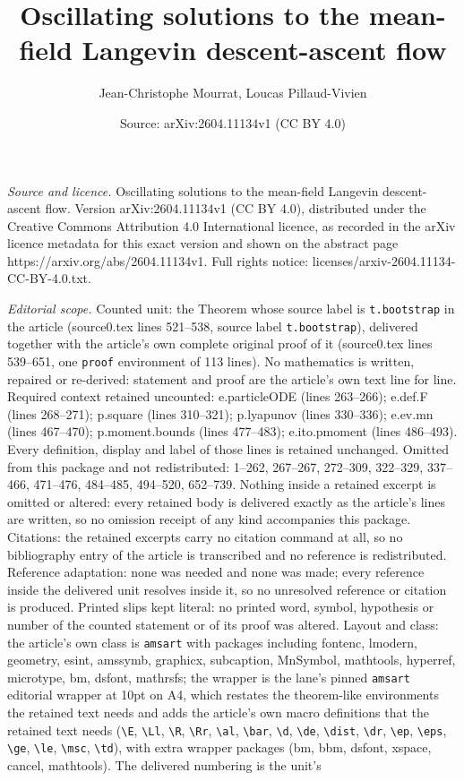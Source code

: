 \documentclass[10pt,a4paper]{amsart}
\title[Oscillating solutions to the mean-field Langevin descent-asc]{Oscillating solutions to the mean-field Langevin descent-ascent flow}
\author{Jean-Christophe Mourrat, Loucas Pillaud-Vivien}
\date{Source: arXiv:2604.11134v1 (CC BY 4.0)}
\begin{document}
\maketitle

\noindent\emph{Source and licence.} Oscillating solutions to the mean-field Langevin descent-ascent flow. Version arXiv:2604.11134v1 (CC BY 4.0), distributed under the Creative Commons Attribution 4.0 International licence, as recorded in the arXiv licence metadata for this exact version and shown on the abstract page https://arxiv.org/abs/2604.11134v1. Full rights notice: licenses/arxiv-2604.11134-CC-BY-4.0.txt.\par\smallskip

\noindent\textit{Editorial scope.} Counted unit: the Theorem whose source label is \texttt{t.bootstrap} in the article (source0.tex lines 521--538, source label \texttt{t.bootstrap}), delivered together with the article's own complete original proof of it (source0.tex lines 539--651, one \texttt{proof} environment of 113 lines). No mathematics is written, repaired or re-derived: statement and proof are the article's own text line for line. Required context retained uncounted: e.particleODE (lines 263--266); e.def.F (lines 268--271); p.square (lines 310--321); p.lyapunov (lines 330--336); e.ev.mn (lines 467--470); p.moment.bounds (lines 477--483); e.ito.pmoment (lines 486--493). Every definition, display and label of those lines is retained unchanged. Omitted from this package and not redistributed: 1--262, 267--267, 272--309, 322--329, 337--466, 471--476, 484--485, 494--520, 652--739. Nothing inside a retained excerpt is omitted or altered: every retained body is delivered exactly as the article's lines are written, so no omission receipt of any kind accompanies this package. Citations: the retained excerpts carry no citation command at all, so no bibliography entry of the article is transcribed and no reference is redistributed. Reference adaptation: none was needed and none was made; every reference inside the delivered unit resolves inside it, so no unresolved reference or citation is produced. Printed slips kept literal: no printed word, symbol, hypothesis or number of the counted statement or of its proof was altered. Layout and class: the article's own class is \texttt{amsart} with packages including fontenc, lmodern, geometry, esint, amssymb, graphicx, subcaption, MnSymbol, mathtools, hyperref, microtype, bm, dsfont, mathrsfs; the wrapper is the lane's pinned \texttt{amsart} editorial wrapper at 10pt on A4, which restates the theorem-like environments the retained text needs and adds the article's own macro definitions that the retained text needs (\texttt{\textbackslash E}, \texttt{\textbackslash Ll}, \texttt{\textbackslash R}, \texttt{\textbackslash Rr}, \texttt{\textbackslash al}, \texttt{\textbackslash bar}, \texttt{\textbackslash d}, \texttt{\textbackslash de}, \texttt{\textbackslash dist}, \texttt{\textbackslash dr}, \texttt{\textbackslash ep}, \texttt{\textbackslash eps}, \texttt{\textbackslash ge}, \texttt{\textbackslash le}, \texttt{\textbackslash msc}, \texttt{\textbackslash td}), with extra wrapper packages (bm, bbm, dsfont, xspace, cancel, mathtools). The delivered numbering is the unit's 
\end{document}
